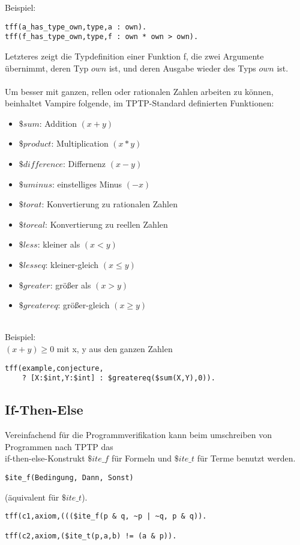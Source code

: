 \documentclass{article}
\begin{document}
Beispiel:
\begin{lstlisting}[language=tptp]
tff(a_has_type_own,type,a : own).
tff(f_has_type_own,type,f : own * own > own).
\end{lstlisting}
Letzteres zeigt die Typdefinition einer Funktion f, die zwei Argumente übernimmt, deren Typ $own$ ist, und deren Ausgabe wieder des Typs $own$ ist.\\
\\
Um besser mit ganzen, rellen oder rationalen Zahlen arbeiten zu können, beinhaltet Vampire folgende, im TPTP-Standard definierten Funktionen:
\begin{itemize}
	\item $\$sum$: Addition $(x + y)$
	\item $\$product$: Multiplication $(x * y)$
	\item $\$difference$: Differnenz $(x - y)$
	\item $\$uminus$: einstelliges Minus $(-x)$
	\item $\$to rat$: Konvertierung zu rationalen Zahlen
	\item $\$to real$: Konvertierung zu reellen Zahlen
	\item $\$less$: kleiner als $(x < y)$
	\item $\$lesseq$: kleiner-gleich $(x \leq y)$
	\item $\$greater$: größer als $(x > y)$
	\item $\$greatereq$: größer-gleich $(x \geq y)$ \\ \\
\end{itemize}
Beispiel: \\ $(x + y) \geq 0$ mit x, y aus den ganzen Zahlen \\
\begin{lstlisting}[language=tptp]
tff(example,conjecture, 
	? [X:$int,Y:$int] : $greatereq($sum(X,Y),0)).\end{lstlisting}

\subsection{If-Then-Else}
\label{subsec:tptpitef}

Vereinfachend für die Programmverifikation kann beim umschreiben von Programmen nach TPTP das \\if-then-else-Konstrukt $ \$ite\_f $ für Formeln und $\$ite\_t$ für Terme benutzt werden.
\begin{lstlisting}[language=tptp]
$ite_f(Bedingung, Dann, Sonst)
\end{lstlisting}
(äquivalent für $\$ite\_t$).
\begin{lstlisting}[language=tptp]
tff(c1,axiom,((($ite_f(p & q, ~p | ~q, p & q)).

tff(c2,axiom,($ite_t(p,a,b) != (a & p)).
\end{lstlisting}
~\cite{hoder2011slides}
\end{document}
